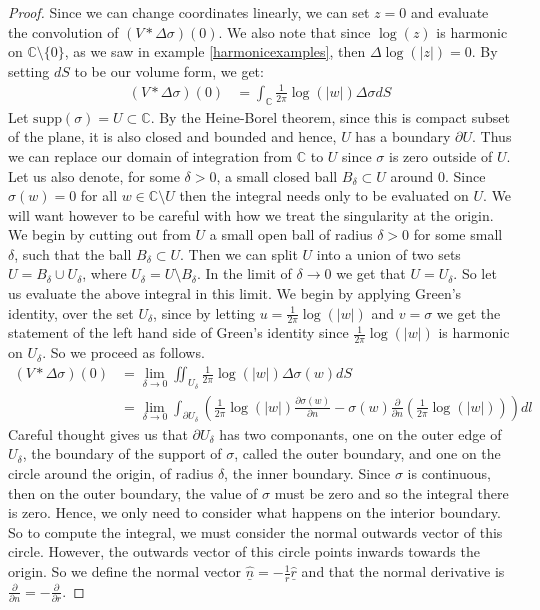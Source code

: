 \documentclass[11pt]{report}
\theoremstyle{definition}
\begin{document}
\begin{proof}
  Since we can change coordinates linearly, we can set $z=0$ and evaluate the convolution of $(V * \Delta \sigma)(0)$. We also note that since $\log(z)$ is harmonic on $\mathbb{C}\setminus \{0\}$, as we saw in example \ref{harmonicexamples}, then $\Delta \log(|z|) = 0 $. By setting $dS$ to be our volume form, we get:
  \begin{align*}
    (V * \Delta \sigma)(0) &= \int_{\mathbb{C}}\frac{1}{2\pi}\log(|w|)\Delta \sigma dS
  \end{align*}
  Let $\text{supp}(\sigma) = U \subset \mathbb{C}$. By the Heine-Borel theorem, since this is compact subset of the plane, it is also closed and bounded and hence, $U$ has a boundary $\partial U$. Thus we can replace our domain of integration from $\mathbb{C}$ to $U$ since $\sigma$ is zero outside of $U$. Let us also denote, for some $\delta > 0$, a small closed ball $B_{\delta} \subset U$ around $0$. Since $\sigma(w) = 0$ for all $w \in \mathbb{C}\setminus U$ then the integral needs only to be evaluated on $U$.
  We will want however to be careful with how we treat the singularity at the origin. We begin by cutting out from $U$ a small open ball of radius $\delta >0$ for some small $\delta$, such that the ball $B_{\delta} \subset U$. Then we can split $U$ into a union of two sets $U=B_{\delta} \cup U_{\delta}$, where $U_{\delta} = U\setminus B_{\delta}$. In the limit of $\delta \rightarrow 0$ we get that $U=U_{\delta}$. So let us evaluate the above integral in this limit.
  We begin by applying Green's identity, over the set $U_{\delta}$, since by letting $u = \frac{1}{2\pi}\log(|w|)$ and $v = \sigma$ we get the statement of the left hand side of Green's identity since $\frac{1}{2\pi}\log(|w|)$ is harmonic on $U_{\delta}$. So we proceed as follows.
  \begin{align*}
    (V * \Delta \sigma)(0) &= \lim_{\delta \rightarrow 0} \iint_{U_{\delta}} \frac{1}{2\pi}\log(|w|)\Delta\sigma(w) dS \\
    &= \lim_{\delta \rightarrow 0} \int_{\partial U_{\delta}}\left(\frac{1}{2\pi}\log(|w|)\frac{\partial \sigma(w)}{\partial n} - \sigma(w)\frac{\partial}{\partial n}\left(\frac{1}{2\pi}\log(|w|)\right)\right)dl
  \end{align*}
  Careful thought gives us that $\partial U_{\delta}$ has two componants, one on the outer edge of $U_{\delta}$, the boundary of the support of $\sigma$, called the outer boundary, and one on the circle around the origin, of radius $\delta$, the inner boundary. Since $\sigma$ is continuous, then on the outer boundary, the value of $\sigma$ must be zero and so the integral there is zero. Hence, we only need to consider what happens on the interior boundary. So to compute the integral, we must consider the normal outwards vector of this circle. However, the outwards vector of this circle points inwards towards the origin. So we define the normal vector $\hat{\underline{n}}= -\frac{1}{r}\hat{\underline{r}}$ and that the normal derivative is $\frac{\partial}{\partial n} = -\frac{\partial}{\partial r}$.

\end{proof}
\end{document}
